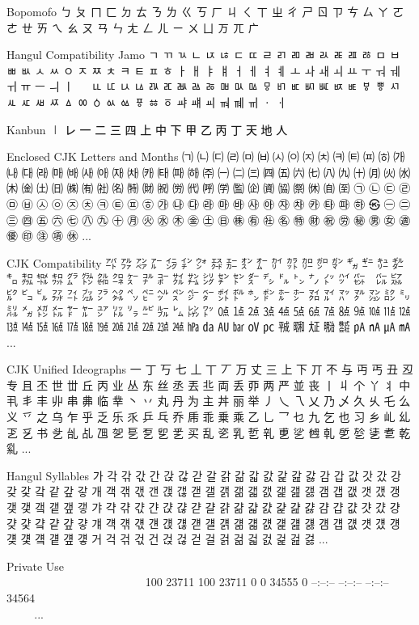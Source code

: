 \documentclass[12pt,twoside]{memoir}
\begin{document}
Bopomofo
ㄅ ㄆ ㄇ ㄈ ㄉ ㄊ ㄋ ㄌ ㄍ ㄎ ㄏ ㄐ ㄑ ㄒ ㄓ ㄔ ㄕ ㄖ ㄗ ㄘ ㄙ ㄚ ㄛ ㄜ ㄝ ㄞ ㄟ ㄠ ㄡ ㄢ ㄣ ㄤ ㄥ ㄦ ㄧ ㄨ ㄩ ㄪ ㄫ ㄬ

Hangul Compatibility Jamo
ㄱ ㄲ ㄳ ㄴ ㄵ ㄶ ㄷ ㄸ ㄹ ㄺ ㄻ ㄼ ㄽ ㄾ ㄿ ㅀ ㅁ ㅂ ㅃ ㅄ ㅅ ㅆ ㅇ ㅈ ㅉ ㅊ ㅋ ㅌ ㅍ ㅎ ㅏ ㅐ ㅑ ㅒ ㅓ ㅔ ㅕ ㅖ ㅗ ㅘ ㅙ ㅚ ㅛ ㅜ ㅝ ㅞ ㅟ ㅠ ㅡ ㅢ ㅣ ㅤ ㅥ ㅦ ㅧ ㅨ ㅩ ㅪ ㅫ ㅬ ㅭ ㅮ ㅯ ㅰ ㅱ ㅲ ㅳ ㅴ ㅵ ㅶ ㅷ ㅸ ㅹ ㅺ ㅻ ㅼ ㅽ ㅾ ㅿ ㆀ ㆁ ㆂ ㆃ ㆄ ㆅ ㆆ ㆇ ㆈ ㆉ ㆊ ㆋ ㆌ ㆍ ㆎ

Kanbun
㆐ ㆑ ㆒ ㆓ ㆔ ㆕ ㆖ ㆗ ㆘ ㆙ ㆚ ㆛ ㆜ ㆝ ㆞ ㆟

Enclosed CJK Letters and Months
㈀ ㈁ ㈂ ㈃ ㈄ ㈅ ㈆ ㈇ ㈈ ㈉ ㈊ ㈋ ㈌ ㈍ ㈎ ㈏ ㈐ ㈑ ㈒ ㈓ ㈔ ㈕ ㈖ ㈗ ㈘ ㈙ ㈚ ㈛ ㈜ ㈠ ㈡ ㈢ ㈣ ㈤ ㈥ ㈦ ㈧ ㈨ ㈩ ㈪ ㈫ ㈬ ㈭ ㈮ ㈯ ㈰ ㈱ ㈲ ㈳ ㈴ ㈵ ㈶ ㈷ ㈸ ㈹ ㈺ ㈻ ㈼ ㈽ ㈾ ㈿ ㉀ ㉁ ㉂ ㉃ ㉠ ㉡ ㉢ ㉣ ㉤ ㉥ ㉦ ㉧ ㉨ ㉩ ㉪ ㉫ ㉬ ㉭ ㉮ ㉯ ㉰ ㉱ ㉲ ㉳ ㉴ ㉵ ㉶ ㉷ ㉸ ㉹ ㉺ ㉻ ㉿ ㊀ ㊁ ㊂ ㊃ ㊄ ㊅ ㊆ ㊇ ㊈ ㊉ ㊊ ㊋ ㊌ ㊍ ㊎ ㊏ ㊐ ㊑ ㊒ ㊓ ㊔ ㊕ ㊖ ㊗ ㊘ ㊙ ㊚ ㊛ ㊜ ㊝ ㊞ ㊟ ㊠ ㊡ ...

CJK Compatibility
㌀ ㌁ ㌂ ㌃ ㌄ ㌅ ㌆ ㌇ ㌈ ㌉ ㌊ ㌋ ㌌ ㌍ ㌎ ㌏ ㌐ ㌑ ㌒ ㌓ ㌔ ㌕ ㌖ ㌗ ㌘ ㌙ ㌚ ㌛ ㌜ ㌝ ㌞ ㌟ ㌠ ㌡ ㌢ ㌣ ㌤ ㌥ ㌦ ㌧ ㌨ ㌩ ㌪ ㌫ ㌬ ㌭ ㌮ ㌯ ㌰ ㌱ ㌲ ㌳ ㌴ ㌵ ㌶ ㌷ ㌸ ㌹ ㌺ ㌻ ㌼ ㌽ ㌾ ㌿ ㍀ ㍁ ㍂ ㍃ ㍄ ㍅ ㍆ ㍇ ㍈ ㍉ ㍊ ㍋ ㍌ ㍍ ㍎ ㍏ ㍐ ㍑ ㍒ ㍓ ㍔ ㍕ ㍖ ㍗ ㍘ ㍙ ㍚ ㍛ ㍜ ㍝ ㍞ ㍟ ㍠ ㍡ ㍢ ㍣ ㍤ ㍥ ㍦ ㍧ ㍨ ㍩ ㍪ ㍫ ㍬ ㍭ ㍮ ㍯ ㍰ ㍱ ㍲ ㍳ ㍴ ㍵ ㍶ ㍻ ㍼ ㍽ ㍾ ㍿ ㎀ ㎁ ㎂ ㎃ ...

CJK Unified Ideographs
一 丁 丂 七 丄 丅 丆 万 丈 三 上 下 丌 不 与 丏 丐 丑 丒 专 且 丕 世 丗 丘 丙 业 丛 东 丝 丞 丟 丠 両 丢 丣 两 严 並 丧 丨 丩 个 丫 丬 中 丮 丯 丰 丱 串 丳 临 丵 丶 丷 丸 丹 为 主 丼 丽 举 丿 乀 乁 乂 乃 乄 久 乆 乇 么 义 乊 之 乌 乍 乎 乏 乐 乑 乒 乓 乔 乕 乖 乗 乘 乙 乚 乛 乜 九 乞 也 习 乡 乢 乣 乤 乥 书 乧 乨 乩 乪 乫 乬 乭 乮 乯 买 乱 乲 乳 乴 乵 乶 乷 乸 乹 乺 乻 乼 乽 乾 乿 ...

Hangul Syllables
가 각 갂 갃 간 갅 갆 갇 갈 갉 갊 갋 갌 갍 갎 갏 감 갑 값 갓 갔 강 갖 갗 갘 같 갚 갛 개 객 갞 갟 갠 갡 갢 갣 갤 갥 갦 갧 갨 갩 갪 갫 갬 갭 갮 갯 갰 갱 갲 갳 갴 갵 갶 갷 갸 갹 갺 갻 갼 갽 갾 갿 걀 걁 걂 걃 걄 걅 걆 걇 걈 걉 걊 걋 걌 걍 걎 걏 걐 걑 걒 걓 걔 걕 걖 걗 걘 걙 걚 걛 걜 걝 걞 걟 걠 걡 걢 걣 걤 걥 걦 걧 걨 걩 걪 걫 걬 걭 걮 걯 거 걱 걲 걳 건 걵 걶 걷 걸 걹 걺 걻 걼 걽 걾 걿 ...

Private Use
                                                                     
100 23711  100 23711    0     0  34555      0 --:--:-- --:--:-- --:--:-- 34564
                                                           ...
\end{document}
